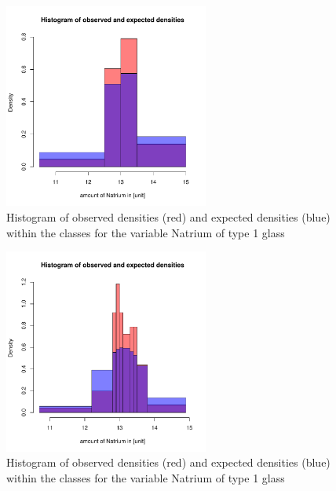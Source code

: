 \documentclass[a4paper, 12pt, titlepage, headsepline, listof = totoc, bibliography = totoc, numbers = noenddot]{scrartcl}
\begin{document}
\begin{appendix}
\begin{figure}[h!]
\centering
\includegraphics[width=0.6\textwidth]{report-chisqType2Na}
\caption{Histogram of observed densities (red) and expected densities (blue) within the classes for the variable Natrium of type 1 glass}
\label{fig:1}
\end{figure}

\begin{figure}[h!]
\centering
\includegraphics[width=0.6\textwidth]{report-chisqType2Na-30}
\caption{Histogram of observed densities (red) and expected densities (blue) within the classes for the variable Natrium of type 1 glass}
\label{fig:2}
\end{figure}


\end{appendix}
\end{document}
